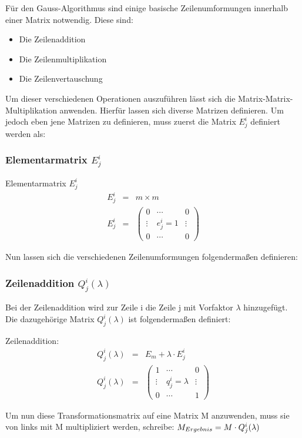 
Für den Gauss-Algorithmus sind einige basische Zeilenumformungen innerhalb einer Matrix notwendig. Diese sind:

\begin{itemize}
\item Die Zeilenaddition
\item Die Zeilenmultiplikation
\item Die Zeilenvertauschung
\end{itemize}

Um dieser verschiedenen Operationen auszuführen lässt sich die Matrix-Matrix-Multiplikation anwenden. Hierfür lassen sich diverse Matrizen definieren.
Um jedoch eben jene Matrizen zu definieren, muss zuerst die Matrix $E^i_j$ definiert werden als:

\subsubsection{Elementarmatrix $E^i_j$}
\begin{Def} Elementarmatrix $E^i_j$
\begin{eqnarray}
	E^i_j &=& m \times m \\
 	E^i_j &=& 
	 	\begin{pmatrix}
	 	0 & \cdots & 0 \\
	 	\vdots & e^i_j = 1 & \vdots \\
	 	0 & \cdots & 0 
 	\end{pmatrix}
\end{eqnarray}
\end{Def}

\hspace{2pt}

\raggedright Nun lassen sich die verschiedenen Zeilenumformungen folgendermaßen definieren:
\subsubsection{Zeilenaddition $Q^i_j(\lambda)$}
Bei der Zeilenaddition wird zur Zeile i die Zeile j mit Vorfaktor $\lambda$ hinzugefügt.
Die dazugehörige Matrix $Q^i_j(\lambda)$ ist folgendermaßen definiert:
\begin{Def} Zeilenaddition:
\begin{eqnarray}
	Q^i_j(\lambda) & = & E_m + \lambda \cdot E^i_j \\
	Q^i_j(\lambda) & = & 
	\begin{pmatrix}
	1 & \cdots & 0 \\ 
	\vdots &  q^i_j = \lambda & \vdots \\  
	0 & \cdots & 1
	\end{pmatrix} 
\end{eqnarray}
\end{Def}
\raggedright
Um nun diese Transformationsmatrix auf eine Matrix M anzuwenden, muss sie von links mit M multipliziert werden, schreibe: $M_{\small Ergebnis} = M \cdot Q^i_j(\lambda)$

